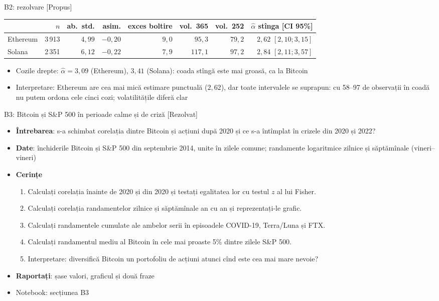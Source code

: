 \ifsolutions
\begin{frame}{B2: rezolvare [Propus]}
\itemsize{\footnotesize}
\begin{center}
\scriptsize
\begin{tabular}{lrrrrrrr}
\toprule
& $n$ & ab.\ std. & asim. & exces boltire & vol.\ 365 & vol.\ 252 & $\hat\alpha$ stînga [CI 95\%] \\
\midrule
Ethereum & 3\,913 & $4{,}99$ & $-0{,}20$ & $9{,}0$ & $95{,}3$ & $79{,}2$ & $2{,}62$ $[2{,}10; 3{,}15]$ \\
Solana & 2\,351 & $6{,}12$ & $-0{,}22$ & $7{,}9$ & $117{,}1$ & $97{,}2$ & $2{,}84$ $[2{,}11; 3{,}57]$ \\
\bottomrule
\end{tabular}
\end{center}
\begin{itemize}
    \item Cozile drepte: $\hat\alpha = 3{,}09$ (Ethereum), $3{,}41$ (Solana): coada stîngă este mai groasă, ca la Bitcoin
    \item Interpretare: Ethereum are cea mai mică estimare punctuală ($2{,}62$), dar toate intervalele se suprapun: cu 58--97 de observații în coadă nu putem ordona cele cinci cozi; volatilitățile diferă clar
\end{itemize}
\end{frame}
\fi

\begin{frame}{B3: Bitcoin și S\&P 500 în perioade calme și de criză [Rezolvat]}
\itemsize{\footnotesize}
\begin{itemize}
\item \textbf{Întrebarea}: s-a schimbat corelația dintre Bitcoin și acțiuni după 2020 și ce s-a întîmplat în crizele din 2020 și 2022?
\item \textbf{Date}: închiderile Bitcoin și S\&P 500 din septembrie 2014, unite în zilele comune; randamente logaritmice zilnice și săptămînale (vineri--vineri)
\item \textbf{Cerințe}
\begin{enumerate}
    \item Calculați corelația înainte de 2020 și din 2020 și testați egalitatea lor cu testul $z$ al lui Fisher.
    \item Calculați corelația randamentelor zilnice și săptămînale an cu an și reprezentați-le grafic.
    \item Calculați randamentele cumulate ale ambelor serii în episoadele COVID-19, Terra/Luna și FTX.
    \item Calculați randamentul mediu al Bitcoin în cele mai proaste 5\% dintre zilele S\&P 500.
    \item Interpretare: diversifică Bitcoin un portofoliu de acțiuni atunci cînd este cea mai mare nevoie?
\end{enumerate}
\item \textbf{Raportați}: șase valori, graficul și două fraze
\item Notebook: secțiunea B3
\end{itemize}
\end{frame}

